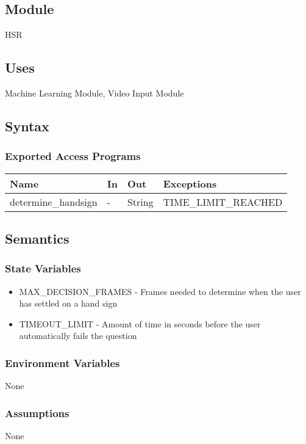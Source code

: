 \documentclass[12pt, titlepage]{article}
\begin{document}
\subsection{Module}
HSR
\subsection{Uses}
Machine Learning Module, Video Input Module
\subsection{Syntax}
\subsubsection{Exported Access Programs}
\begin{center}
\begin{tabular}{p{4cm} p{2cm} p{2cm} p{4cm}}
\hline
\textbf{Name} & \textbf{In} & \textbf{Out} & \textbf{Exceptions} \\
\hline
determine\_handsign & - & String & TIME\_LIMIT\_REACHED \\
\hline
\end{tabular}
\end{center}
\subsection{Semantics}
\subsubsection{State Variables}
\begin{itemize}
    \item MAX\_DECISION\_FRAMES - Frames needed to determine when the user has settled on a hand sign
    \item TIMEOUT\_LIMIT - Amount of time in seconds before the user automatically fails the question
\end{itemize}
\subsubsection{Environment Variables}
None
\subsubsection{Assumptions}
None
\end{document}
